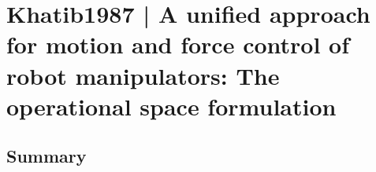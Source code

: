 \section{Khatib1987 | A unified approach for motion and force control of robot manipulators: The operational space formulation}

\cite{khatib1987} 

\subsection{Summary}
